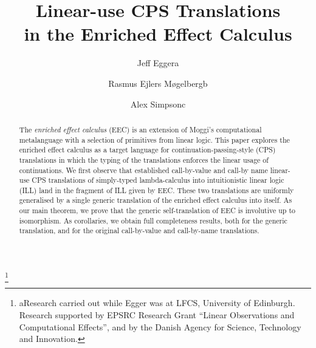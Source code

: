 \documentclass{LMCS}
\begin{document}
\title[Linear-use CPS Translations in EEC]{Linear-use CPS Translations \\ in the Enriched Effect Calculus\rsuper*}

\author[J.~Egger]{Jeff Egger\rsuper a}  
\address{{\lsuper a}Department of Physics and Atmospheric Science,
Dalhousie University, Halifax, N.S., Canada}
\thanks{{\lsuper a}Research carried out while Egger was at 
LFCS, University of Edinburgh.
Research supported by EPSRC Research Grant ``Linear Observations and Computational Effects'',
and by the Danish Agency for Science, Technology and Innovation.}


\author[R.~E.~M{\o}gelberg]{Rasmus Ejlers M{\o}gelberg\rsuper b}
\address{{\lsuper b}IT University of Copenhagen, Copenhagen,  Denmark}

\author[A.~Simpson]{Alex Simpson\rsuper c}
\address{{\lsuper c}LFCS, School of Informatics, University of Edinburgh, Scotland, UK}




\maketitle




\begin{abstract}
\noindent
The \emph{enriched effect calculus} (EEC) is an extension of Moggi's
computational metalanguage with a selection of primitives
from linear logic. This paper explores the enriched effect calculus
as a target language for continuation-passing-style (CPS) translations
in which the typing of the translations enforces the linear usage
of continuations. We first observe that 
established call-by-value and call-by name linear-use
CPS translations of simply-typed lambda-calculus into intuitionistic linear logic (ILL) 
land in the fragment of ILL given by EEC.
These two translations are
uniformly generalised by a single generic
translation of the enriched effect calculus into itself.
As our main theorem, we prove that the generic
self-translation of EEC is involutive up to isomorphism.
As corollaries, we obtain full completeness results,
both for the generic translation, and for 
the original call-by-value and call-by-name translations.
\end{abstract}
\end{document}
